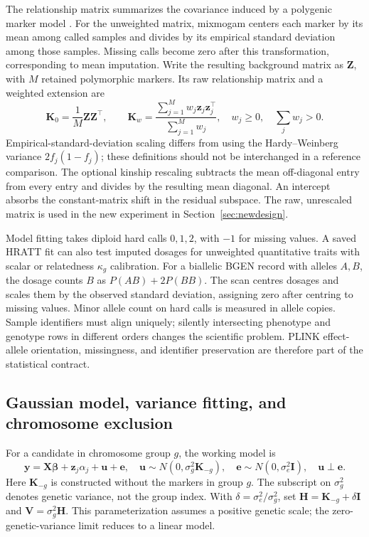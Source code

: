 \documentclass[11pt]{article}
\newcommand{\y}{\mathbf{y}}
\newcommand{\z}{\mathbf{z}}
\newcommand{\K}{\mathbf{K}}
\newcommand{\X}{\mathbf{X}}
\newcommand{\V}{\mathbf{V}}
\newcommand{\I}{\mathbf{I}}
\newcommand{\Hm}{\mathbf{H}}
\begin{document}
The relationship matrix summarizes the covariance induced by a
polygenic marker model \citep{yang2010}. For the unweighted matrix,
mixmogam centers each marker by
its mean among called samples and divides by its empirical standard
deviation among those samples. Missing calls become zero after this
transformation, corresponding to mean imputation. Write the resulting
background matrix as $\mathbf Z$, with $M$ retained polymorphic markers.
Its raw relationship matrix and a weighted extension are
\begin{equation}
 \K_0=\frac{1}{M}\mathbf Z\mathbf Z^\top,
 \qquad
 \K_w=\frac{\sum_{j=1}^{M} w_j\z_j\z_j^\top}{\sum_{j=1}^{M}w_j},
 \quad w_j\geq0,\quad \sum_j w_j>0.
 \label{eq:grm}
\end{equation}
Empirical-standard-deviation scaling differs from using the
Hardy--Weinberg variance $2f_j(1-f_j)$; these definitions should not be
interchanged in a reference comparison. The optional kinship rescaling
subtracts the mean off-diagonal entry from every entry and divides by
the resulting mean diagonal. An intercept absorbs the constant-matrix
shift in the residual subspace. The raw, unrescaled matrix is used in
the new experiment in Section~\ref{sec:newdesign}.

Model fitting takes diploid hard calls $0,1,2$, with $-1$ for missing
values. A saved HRATT fit can also test imputed dosages for unweighted
quantitative traits with scalar or relatedness $\kappa_g$ calibration.
For a biallelic BGEN record with alleles $A,B$, the dosage counts $B$ as
$P(AB)+2P(BB)$. The scan centres dosages and scales them by the observed
standard deviation, assigning zero after centring to missing values.
Minor allele count on hard calls is measured in allele copies. Sample identifiers must align
uniquely; silently intersecting phenotype and genotype rows in different
orders changes the scientific problem. PLINK effect-allele orientation,
missingness, and identifier preservation are therefore part of the
statistical contract.

\subsection{Gaussian model, variance fitting, and chromosome exclusion}

For a candidate in chromosome group $g$, the working model is
\begin{equation}
 \y=\X\boldsymbol\beta+\z_j\alpha_j+\mathbf u+\mathbf e,
 \quad \mathbf u\sim N(0,\sigma_g^2\K_{-g}),\quad
 \mathbf e\sim N(0,\sigma_e^2\I),\quad \mathbf u\perp\mathbf e.
 \label{eq:model}
\end{equation}
Here $\K_{-g}$ is constructed without the markers in group $g$.
The subscript on $\sigma_g^2$ denotes genetic variance, not the group
index. With $\delta=\sigma_e^2/\sigma_g^2$, set
$\Hm=\K_{-g}+\delta\I$ and $\V=\sigma_g^2\Hm$.
This parameterization assumes a positive genetic scale; the
zero-genetic-variance limit reduces to a linear model.
\end{document}
